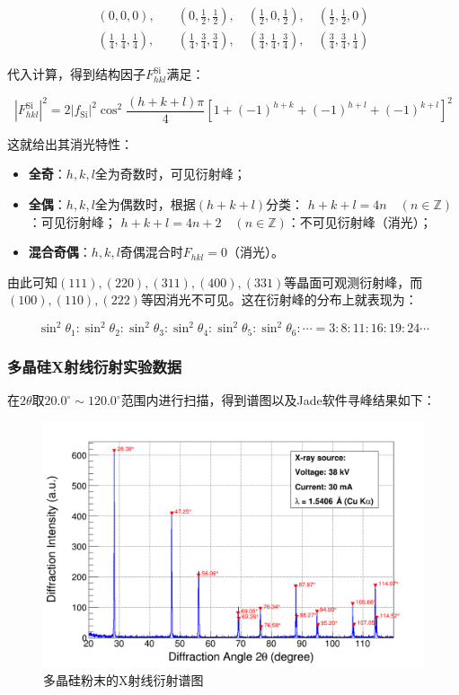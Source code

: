 \documentclass{thuemp}
\begin{document}
\begin{align*}
(0,0,0),\quad &(0,\frac{1}{2},\frac{1}{2}),\quad (\frac{1}{2},0,\frac{1}{2}),\quad (\frac{1}{2},\frac{1}{2},0) \\
(\frac{1}{4},\frac{1}{4},\frac{1}{4}),\quad &(\frac{1}{4},\frac{3}{4},\frac{3}{4}),\quad (\frac{3}{4},\frac{1}{4},\frac{3}{4}),\quad (\frac{3}{4},\frac{3}{4},\frac{1}{4})
\end{align*}

代入计算，得到结构因子$F_{hkl}^{\text{Si}}$满足：

\begin{equation}
    |F_{hkl}^{\text{Si}}|^2 = 2|f_{\text{Si}}|^2 \cos^2 \frac{(h+k+l)\pi}{4}[1 + (-1)^{h+k} + (-1)^{h+l} + (-1)^{k+l}]^2
    \label{eq:si_struct_fac}
\end{equation}

这就给出其消光特性：

\begin{itemize}
    \item \textbf{全奇}：$h,k,l$全为奇数时，可见衍射峰；
    \item \textbf{全偶}：$h,k,l$全为偶数时，根据$(h+k+l)$分类：
        \subitem $h+k+l = 4n \quad(n\in\mathbb{Z})$：可见衍射峰；
        \subitem $h+k+l = 4n+2 \quad(n\in\mathbb{Z})$：不可见衍射峰（消光）；
    \item \textbf{混合奇偶}：$h,k,l$奇偶混合时$F_{hkl}=0$（消光）。
\end{itemize}

由此可知$(111), (220), (311), (400), (331)$等晶面可观测衍射峰，而$(100), (110), (222)$等因消光不可见。这在衍射峰的分布上就表现为：

\begin{equation}
    \sin^2\theta_1 : \sin^2\theta_2: \sin^2\theta_3 : \sin^2\theta_4 : \sin^2\theta_5 : \sin^2\theta_6 : \cdots =
    3 : 8 : 11 : 16: 19: 24 \cdots
    \label{eq:si_diff_patt}
\end{equation}

\subsubsection{多晶硅X射线衍射实验数据}

在$2\theta$取$20.0^\circ \sim 120.0^\circ$范围内进行扫描，得到谱图以及Jade软件寻峰结果如下：

\begin{figure}[H]
    \centering
    \includegraphics[width=0.8\linewidth]{../Data/Silicon-multi.png}
    \caption{多晶硅粉末的X射线衍射谱图}
    \label{fig:si_xrd}    
\end{figure}
\end{document}
